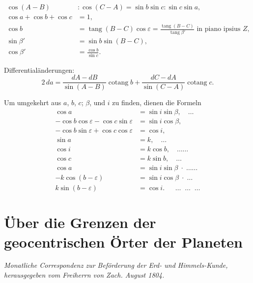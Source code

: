 \documentclass[12pt,a4paper]{article}
\DeclareMathOperator{\tang}{tang}
\DeclareMathOperator{\cotang}{cotang}
\begin{document}
\[
\begin{aligned}
\cos(A-B) &: \cos(C-A) = \sin b \sin c : \sin c \sin a,\\
\cos a + \cos b + \cos c &= 1,\\
\cos b &= \tang(B-C)\cos\varepsilon = \frac{\tang(B-C)}{\tang\beta'} \text{ in piano ipsius } Z,\\
\sin\beta' &= \sin b \sin(B-C),\\
\cos\beta' &= \frac{\cos b}{\sin c}.
\end{aligned}
\]

Differentialänderungen:
\[
2\,da = \frac{dA-dB}{\sin(A-B)}\cotang b + \frac{dC-dA}{\sin(C-A)}\cotang c.
\]

Um umgekehrt aus $a$, $b$, $c$; $\beta$, und $i$ zu finden, dienen die Formeln
\begin{align*}
\cos a &= \sin i \sin\beta,\quad\ldots\\
-\cos b \cos\varepsilon - \cos c \sin\varepsilon &= \sin i \cos\beta,\\
-\cos b \sin\varepsilon + \cos c \cos\varepsilon &= \cos i,\\
\sin a &= k,\quad\ldots\\
\cos i &= k\cos b,\quad\ldots\ldots\\
\cos c &= k\sin b,\quad\ldots\\
\cos a &= \sin i \sin\beta\;\cdot\;\ldots\ldots\\
-k\cos(b-\varepsilon) &= \sin i \cos\beta\;\cdot\;\ldots\\
k\sin(b-\varepsilon) &= \cos i.\quad\;\;\ldots\;\;\ldots\;\;\ldots
\end{align*}

\newpage
\section{Über die Grenzen der geocentrischen Örter der Planeten}
\label{sec:grenzen}


\begin{center}
\textit{Monatliche Correspondenz zur Beförderung der Erd- und Himmels-Kunde,}\\
\textit{herausgegeben vom Freiherrn von Zach. August 1804.}
\end{center}
\end{document}
